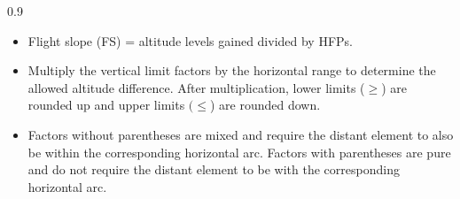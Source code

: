 \begin{twocolumntablefloat}
\begin{twocolumntable}
\begin{tablenote}{0.9\linewidth}
\begin{itemize}
\item
Flight slope (FS) = altitude levels gained divided by HFPs.

\item
Multiply the vertical limit factors by the horizontal range to determine the allowed altitude difference. After multiplication, lower limits ($\ge$) are rounded up and upper limits $(\le$) are rounded down. 

\item
Factors without parentheses are mixed and require the distant element to also be within the corresponding horizontal arc. Factors with parentheses are pure and do not require the distant element to be with the corresponding horizontal arc. 

\end{itemize}
\end{tablenote}


\end{twocolumntable}
\end{twocolumntablefloat}
